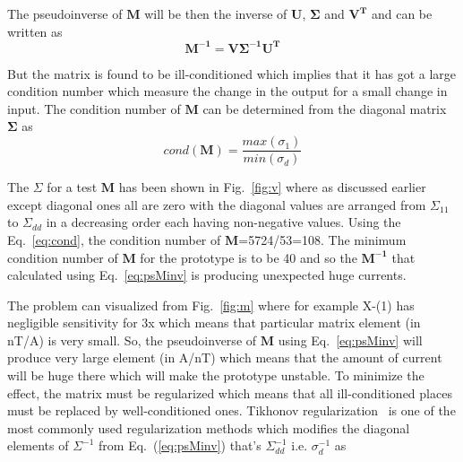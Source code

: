 The pseudoinverse of $\bm{M}$ will be then the inverse of $\bm{U}$, $\bm{\Sigma}$ and $\bm{V^T}$ and can be written as
\begin{equation}\label{eq:psMinv}
    \bm{M^{-1}} = \bm{V \Sigma^{-1} U^T}
\end{equation}




But the matrix is found to be ill-conditioned which implies that it has got a large condition number which measure the change in the output for a small change in input. The condition number of $\bm{M}$ can be determined from the diagonal matrix $\bm{\Sigma}$ as 
 \begin{equation}\label{eq:cond}
     cond(\bm{M})=\frac{max(\sigma_1)}{min(\sigma_d)}
 \end{equation}
 

The $\Sigma$ for a test $\bm{M}$ has been shown in Fig.~\ref{fig:v} where as discussed earlier except diagonal ones all are zero with the diagonal values are arranged from $\Sigma_{11}$ to $\Sigma_{dd}$ in a decreasing order each having non-negative values. Using the Eq.~\ref{eq:cond}, the condition number of $\bm{M}$=5724/53=108. The minimum condition number of $\bm{M}$ for the prototype is to be 40 and so the $\bm{M^{-1}}$ that calculated using Eq.~\ref{eq:psMinv} is producing unexpected huge currents. 


\FloatBarrier

The problem can visualized from Fig.~\ref{fig:m} where for example X-(1) has negligible sensitivity for 3x which means that particular matrix element (in nT/A) is very small. So, the pseudoinverse of $\bm{M}$ using Eq.~\ref{eq:psMinv} will produce very large element (in A/nT) which means that the amount of current will be huge there which will make the prototype unstable. To minimize the effect, the matrix must be regularized which means that all ill-conditioned places must be replaced  by well-conditioned ones.  Tikhonov regularization~\cite{tikhonov2013numerical,tikhonov_book,svd,svd3} is one of the most commonly used regularization methods which modifies the diagonal elements of $\Sigma^{-1}$ from Eq.~(\ref{eq:psMinv}) that's $\Sigma^{-1}_{dd}$ i.e. $\sigma_d^{-1}$ as

